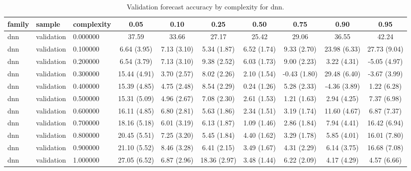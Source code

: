 \begin{table}
\caption{Validation forecast accuracy by complexity for dnn.}
\label{tab:validation_dnn}
\begin{tabular}{lllccccccc}
\toprule
family & sample & complexity & 0.05 & 0.10 & 0.25 & 0.50 & 0.75 & 0.90 & 0.95 \\
\midrule
dnn & validation & 0.000000 & 37.59 & 33.66 & 27.17 & 25.42 & 29.06 & 36.55 & 42.24 \\
dnn & validation & 0.100000 & 6.64
(3.95) & 7.13
(3.10) & 5.34
(1.87) & 6.52
(1.74) & 9.33
(2.70) & 23.98
(6.33) & 27.73
(9.04) \\
dnn & validation & 0.200000 & 6.54
(3.79) & 7.13
(3.10) & 9.38
(2.52) & 6.03
(1.73) & 9.00
(2.23) & 3.22
(4.31) & -5.05
(4.97) \\
dnn & validation & 0.300000 & 15.44
(4.91) & 3.70
(2.57) & 8.02
(2.26) & 2.10
(1.54) & -0.43
(1.80) & 29.48
(6.40) & -3.67
(3.99) \\
dnn & validation & 0.400000 & 15.39
(4.85) & 4.75
(2.48) & 8.54
(2.29) & 0.24
(1.26) & 5.28
(2.33) & -4.36
(3.89) & 1.22
(6.28) \\
dnn & validation & 0.500000 & 15.31
(5.09) & 4.96
(2.67) & 7.08
(2.30) & 2.61
(1.53) & 1.21
(1.63) & 2.94
(4.25) & 7.37
(6.98) \\
dnn & validation & 0.600000 & 16.11
(4.85) & 6.80
(2.81) & 5.63
(1.86) & 2.34
(1.51) & 3.19
(1.74) & 11.60
(4.67) & 6.87
(7.37) \\
dnn & validation & 0.700000 & 18.16
(5.18) & 6.01
(3.19) & 6.13
(1.87) & 1.09
(1.46) & 2.86
(1.84) & 7.94
(4.41) & 16.42
(6.94) \\
dnn & validation & 0.800000 & 20.45
(5.51) & 7.25
(3.20) & 5.45
(1.84) & 4.40
(1.62) & 3.29
(1.78) & 5.85
(4.01) & 16.01
(7.80) \\
dnn & validation & 0.900000 & 21.10
(5.52) & 8.46
(3.28) & 6.41
(2.15) & 3.49
(1.67) & 4.31
(2.29) & 6.14
(3.75) & 16.68
(7.08) \\
dnn & validation & 1.000000 & 27.05
(6.52) & 6.87
(2.96) & 18.36
(2.97) & 3.48
(1.44) & 6.22
(2.09) & 4.17
(4.29) & 4.57
(6.66) \\
\bottomrule
\end{tabular}
\end{table}
